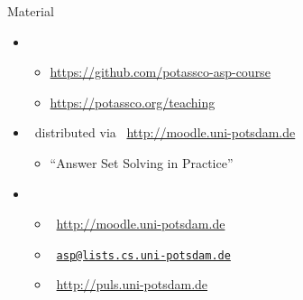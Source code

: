 \begin{frame}{Material}
  \bigskip
  \begin{itemize}\itemsep 0pt
  \item {}
    \begin{itemize}
    \item \url{https://github.com/potassco-asp-course}
    \item \url{https://potassco.org/teaching}
    \end{itemize}
    \medskip
  \item {} \ distributed via \ \url{http://moodle.uni-potsdam.de}
    \begin{itemize}
    \item {} ``Answer Set Solving in Practice''
    \end{itemize}
    \medskip
  \item {}
    \begin{itemize}
    \item {}      \ \url{http://moodle.uni-potsdam.de}
    \item {}          \ \href{mailto:asp@lists.cs.uni-potsdam.de}{\texttt{asp@lists.cs.uni-potsdam.de}}
    \item {} \ \url{http://puls.uni-potsdam.de}
    \end{itemize}
    \medskip
  \end{itemize}
\end{frame}
%
